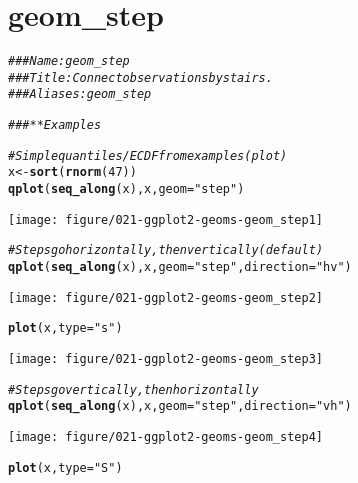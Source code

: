 \documentclass[a4paper,titlepage]{tufte-handout}\usepackage[]{graphicx}\usepackage[]{color}
\makeatletter
\def\maxwidth{ %
  \ifdim\Gin@nat@width>\linewidth
    \linewidth
  \else
    \Gin@nat@width
  \fi
}
\newcommand{\hlnum}[1]{\textcolor[rgb]{0.686,0.059,0.569}{#1}}%
\newcommand{\hlstr}[1]{\textcolor[rgb]{0.192,0.494,0.8}{#1}}%
\newcommand{\hlcom}[1]{\textcolor[rgb]{0.678,0.584,0.686}{\textit{#1}}}%
\newcommand{\hlstd}[1]{\textcolor[rgb]{0.345,0.345,0.345}{#1}}%
\newcommand{\hlkwb}[1]{\textcolor[rgb]{0.69,0.353,0.396}{#1}}%
\newcommand{\hlkwc}[1]{\textcolor[rgb]{0.333,0.667,0.333}{#1}}%
\newcommand{\hlkwd}[1]{\textcolor[rgb]{0.737,0.353,0.396}{\textbf{#1}}}%
\newenvironment{kframe}{%
 \def\at@end@of@kframe{}%
 \ifinner\ifhmode%
  \def\at@end@of@kframe{\end{minipage}}%
  \begin{minipage}{\columnwidth}%
 \fi\fi%
 \def\FrameCommand##1{\hskip\@totalleftmargin \hskip-\fboxsep
 \colorbox{shadecolor}{##1}\hskip-\fboxsep
     \hskip-\linewidth \hskip-\@totalleftmargin \hskip\columnwidth}%
 \MakeFramed {\advance\hsize-\width
   \@totalleftmargin\z@ \linewidth\hsize
   \@setminipage}}%
 {\par\unskip\endMakeFramed%
 \at@end@of@kframe}
\newenvironment{knitrout}{}{} %
\makeatother
\begin{document}
\section{geom\_step}

\begin{knitrout}
\color{fgcolor}\begin{kframe}
\begin{alltt}
\hlcom{### Name: geom_step}
\hlcom{### Title: Connect observations by stairs.}
\hlcom{### Aliases: geom_step}

\hlcom{### ** Examples}

\hlcom{# Simple quantiles/ECDF from examples(plot)}
\hlstd{x} \hlkwb{<-} \hlkwd{sort}\hlstd{(}\hlkwd{rnorm}\hlstd{(}\hlnum{47}\hlstd{))}
\hlkwd{qplot}\hlstd{(}\hlkwd{seq_along}\hlstd{(x), x,} \hlkwc{geom}\hlstd{=}\hlstr{"step"}\hlstd{)}
\end{alltt}
\end{kframe}
\texttt{[image: figure/021-ggplot2-geoms-geom\_step1]} 
\begin{kframe}\begin{alltt}
\hlcom{# Steps go horizontally, then vertically (default)}
\hlkwd{qplot}\hlstd{(}\hlkwd{seq_along}\hlstd{(x), x,} \hlkwc{geom}\hlstd{=}\hlstr{"step"}\hlstd{,} \hlkwc{direction} \hlstd{=} \hlstr{"hv"}\hlstd{)}
\end{alltt}
\end{kframe}
\texttt{[image: figure/021-ggplot2-geoms-geom\_step2]} 
\begin{kframe}\begin{alltt}
\hlkwd{plot}\hlstd{(x,} \hlkwc{type} \hlstd{=} \hlstr{"s"}\hlstd{)}
\end{alltt}
\end{kframe}
\texttt{[image: figure/021-ggplot2-geoms-geom\_step3]} 
\begin{kframe}\begin{alltt}
\hlcom{# Steps go vertically, then horizontally}
\hlkwd{qplot}\hlstd{(}\hlkwd{seq_along}\hlstd{(x), x,} \hlkwc{geom}\hlstd{=}\hlstr{"step"}\hlstd{,} \hlkwc{direction} \hlstd{=} \hlstr{"vh"}\hlstd{)}
\end{alltt}
\end{kframe}
\texttt{[image: figure/021-ggplot2-geoms-geom\_step4]} 
\begin{kframe}\begin{alltt}
\hlkwd{plot}\hlstd{(x,} \hlkwc{type} \hlstd{=} \hlstr{"S"}\hlstd{)}
\end{alltt}

\end{kframe}
\end{knitrout}
\end{document}
